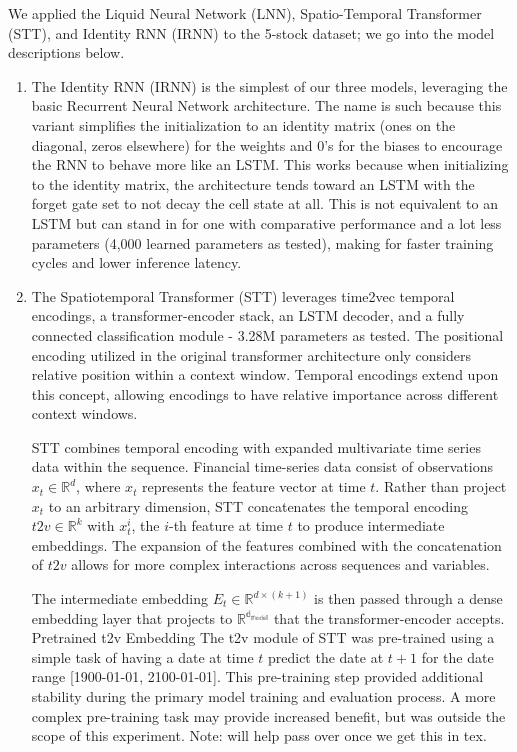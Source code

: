 \documentclass[10pt,twocolumn,letterpaper]{article}
\begin{document}
We applied the Liquid Neural Network (LNN), Spatio-Temporal Transformer (STT), and Identity RNN (IRNN) to the 5-stock dataset; we go into the model descriptions below.

    \begin{enumerate}
        \item{The Identity RNN (IRNN) is the simplest of our three models, leveraging the basic Recurrent Neural Network architecture. The name is such because this variant simplifies the initialization to an identity matrix (ones on the diagonal, zeros elsewhere) for the weights and 0’s for the biases to encourage the RNN to behave more like an LSTM. This works because when initializing to the identity matrix, the architecture tends toward an LSTM with the forget gate set to not decay the cell state at all. This is not equivalent to an LSTM but can stand in for one with comparative performance and a lot less parameters (4,000 learned parameters as tested), making for faster training cycles and lower inference latency.}
        \item{The Spatiotemporal Transformer (STT) leverages time2vec temporal encodings, a transformer-encoder stack, an LSTM decoder, and a fully connected classification module - 3.28M parameters as tested. The positional encoding utilized in the original transformer architecture only considers relative position within a context window. Temporal encodings extend upon this concept, allowing encodings to have relative importance across different context windows.

STT combines temporal encoding with expanded multivariate time series data within the sequence. Financial time-series data consist of observations $x_t \in \mathbb{R}^d$, where $x_t$ represents the feature vector at time $t$. Rather than project $x_t$ to an arbitrary dimension, STT concatenates the temporal encoding $t2v \in \mathbb{R}^k$ with $x^i_t$, the $i$-th feature at time $t$ to produce intermediate embeddings. The expansion of the features combined with the concatenation of $t2v$ allows for more complex interactions across sequences and variables.

            The intermediate embedding $E_t \in \mathbb{R}^{d \times (k + 1)}$ is then passed through a dense embedding layer that projects to $\mathbb{R^{d_{model}}}$ that the transformer-encoder accepts.
Pretrained t2v Embedding
The t2v module of STT was pre-trained using a simple task of having a date at time $t$ predict the date at $t+1$ for the date range [1900-01-01, 2100-01-01]. This pre-training step provided additional stability during the primary model training and evaluation process. A more complex pre-training task may provide increased benefit, but was outside the scope of this experiment.
            Note: will help pass over once we get this in tex.}


\end{enumerate}
\end{document}

